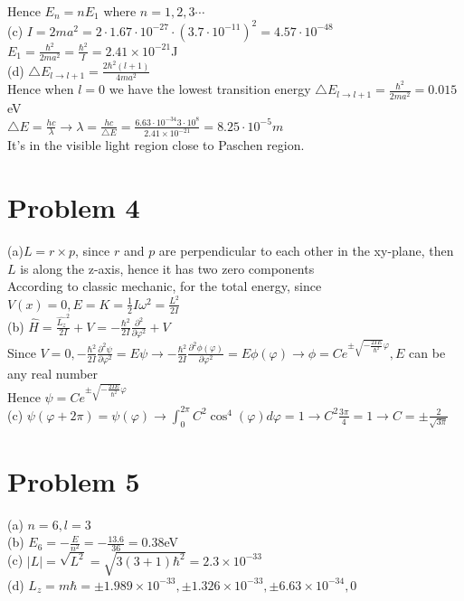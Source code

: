 \documentclass[a4paper]{article}
\begin{document}
    \\Hence $E_n=nE_1$ where $n=1,2,3\cdots$
    \\(c) $I=2ma^2=2\cdot1.67\cdot10^{-27}\cdot(3.7\cdot10^{-11})^2=4.57\cdot10^{-48}$
    \\$E_1=\frac{\hbar^2}{2ma^2}=\frac{\hbar^2}{I}=2.41\times10^{-21}$J
    \\(d) $\bigtriangleup E_{l\rightarrow l+1}=\frac{2\hbar^2(l+1)}{4ma^2}$
    \\Hence when $l=0$ we have the lowest transition energy $\bigtriangleup E_{l\rightarrow l+1}=\frac{\hbar^2}{2ma^2}=0.015$eV
    \\$\bigtriangleup E=\frac{hc}{\lambda}\rightarrow\lambda=\frac{hc}{\bigtriangleup E}=\frac{6.63\cdot10^{-34}3\cdot10^8}{2.41\times10^{-21}}=8.25\cdot10^{-5}m$
    \\It's in the visible light region close to Paschen region.
\section{Problem 4}
\noindent (a)$L=r\times p$, since $r$ and $p$ are perpendicular to each other in the xy-plane, then $L$ is along the z-axis, hence it has two zero components
\\According to classic mechanic, for the total energy, since $V(x)=0,E=K=\frac{1}{2}I\omega^2=\frac{L^2}{2I}$
\\(b) $\hat{H}=\frac{\hat{L_z}^2}{2I}+V=-\frac{\hbar^2}{2I}\frac{\partial^2}{\partial\varphi^2}+V$
\\Since $V=0,-\frac{\hbar^2}{2I}\frac{\partial^2\psi}{\partial\varphi^2}=E\psi\rightarrow-\frac{\hbar^2}{2I}\frac{\partial^2\phi(\varphi)}{\partial\varphi^2}=E\phi(\varphi)\rightarrow \phi=Ce^{\pm\sqrt{-\frac{2IE}{\hbar^2}}\varphi}, E$ can be any real number
\\Hence $\psi=Ce^{\pm\sqrt{-\frac{2IE}{\hbar^2}}\varphi}$
\\ (c) $\psi(\varphi+2\pi)=\psi(\varphi)\rightarrow\int_0^{2\pi}C^2\cos^4(\varphi)d\varphi=1\rightarrow C^2\frac{3\pi}{4}=1\rightarrow C=\pm\frac{2}{\sqrt{3\pi}}$
\section{Problem 5}
\noindent (a) $n=6,l=3$
\\ (b) $E_6=-\frac{E}{n^2}=-\frac{13.6}{36}=0.38$eV
\\ (c) $|L|=\sqrt{L^2}=\sqrt{3(3+1)\hbar^2}=2.3\times10^{-33}$
\\ (d) $L_z=m\hbar=\pm1.989\times10^{-33},\pm1.326\times10^{-33},\pm6.63\times10^{-34},0$
\end{document}

